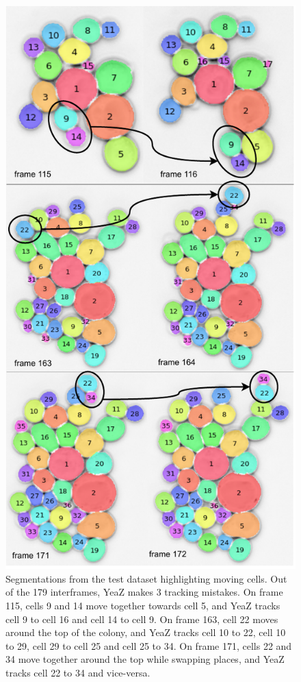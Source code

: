 \documentclass[10pt,conference,compsocconf,a4paper]{IEEEtran}
\begin{document}
		\begin{figure}[h!]
			\centering
			\includegraphics[width=\linewidth]{figures/mistracks.pdf}
			\caption{Segmentations from the test dataset highlighting moving cells. Out of the 179 interframes, YeaZ makes 3 tracking mistakes. On frame 115, cells 9 and 14 move together towards cell 5, and YeaZ tracks cell 9 to cell 16 and cell 14 to cell 9. On frame 163, cell 22 moves around the top of the colony, and YeaZ tracks cell 10 to 22, cell 10 to 29, cell 29 to cell 25 and cell 25 to 34. On frame 171, cells 22 and 34 move together around the top while swapping places, and YeaZ tracks cell 22 to 34 and vice-versa.}
			\label{fig:mistracks}
		\end{figure}
		
\end{document}
